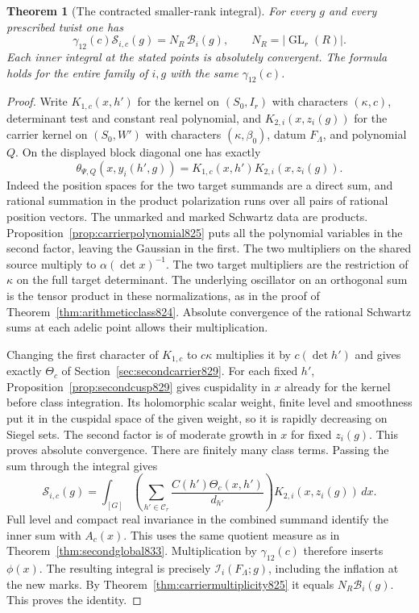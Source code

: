 \documentclass[a4paper,11pt]{article}
\newtheorem{theorem}[proposition]{Theorem}
\theoremstyle{definition}
\theoremstyle{remark}
\numberwithin{equation}{section}
\begin{document}
\begin{theorem}[The contracted smaller-rank integral]
\leavevmode\label{thm:smallthird834}
For every \(g\) and every prescribed twist one has
\[
     \gamma_{12}(c)\mathcal S_{i,c}(g)
           =N_R\,\mathcal B_i(g),\qquad
           N_R=|\operatorname{GL}_{r}(R)|.
\]
Each inner integral at the stated points is absolutely
convergent. The formula holds for the entire family of
\(i,g\) with the same \(\gamma_{12}(c)\).
\end{theorem}
\begin{proof}
Write \(K_{1,c}(x,h')\) for the kernel on \((S_0,I_r)\)
with characters \((\kappa,c)\), determinant test and constant
real polynomial, and \(K_{2,i}(x,z_i(g))\) for the carrier
kernel on \((S_0,W')\) with characters \((\kappa,\beta_0)\),
datum \(F_\Lambda\), and polynomial \(Q\).
On the displayed block diagonal one has exactly
\[
     \theta_{\Psi,Q}(x,y_i(h',g))
                 =K_{1,c}(x,h')K_{2,i}(x,z_i(g)).
\]
Indeed the position spaces for the two target summands are
a direct sum, and rational summation in the product
polarization runs over all pairs of rational position vectors.
The unmarked and marked Schwartz data are products.
Proposition~\ref{prop:carrierpolynomial825} puts all the
polynomial variables in the second factor, leaving the
Gaussian in the first. The two multipliers on the shared
source multiply to \(\alpha(\det x)^{-1}\). The two target
multipliers are the restriction of \(\kappa\) on the full
target determinant. The underlying oscillator on an orthogonal
sum is the tensor product in these normalizations, as in
the proof of Theorem~\ref{thm:arithmeticclass824}. Absolute
convergence of the rational Schwartz sums at each adelic point
allows their multiplication.

Changing the first character of \(K_{1,c}\) to \(c\kappa\)
multiplies it by \(c(\det h')\) and gives exactly \(\Theta_c\)
of Section~\ref{sec:secondcarrier829}. For each fixed \(h'\),
Proposition~\ref{prop:secondcusp829} gives cuspidality in \(x\)
already for the kernel before class integration. Its
holomorphic scalar weight, finite level and smoothness put
it in the cuspidal space of the given weight, so it is
rapidly decreasing on Siegel sets. The second factor is of
moderate growth in \(x\) for fixed \(z_i(g)\).
This proves absolute convergence. There are finitely many
class terms. Passing the sum through the integral gives
\[
 \mathcal S_{i,c}(g)=
 \int_{[G]}\left(\sum_{h'\in\mathcal C_r}
     \frac{C(h')\Theta_c(x,h')}{d_{h'}}\right)
                     K_{2,i}(x,z_i(g))\,dx .
\]
Full level and compact real invariance in the combined
summand identify the inner sum with \(A_c(x)\). This uses
the same quotient measure as in Theorem~\ref{thm:secondglobal833}.
Multiplication by \(\gamma_{12}(c)\) therefore inserts
\(\phi(x)\). The resulting integral is precisely
\(\mathcal I_i(F_\Lambda;g)\), including the inflation at
the new marks. By Theorem~\ref{thm:carriermultiplicity825}
it equals \(N_R\mathcal B_i(g)\). This proves the identity.
\end{proof}
\end{document}
